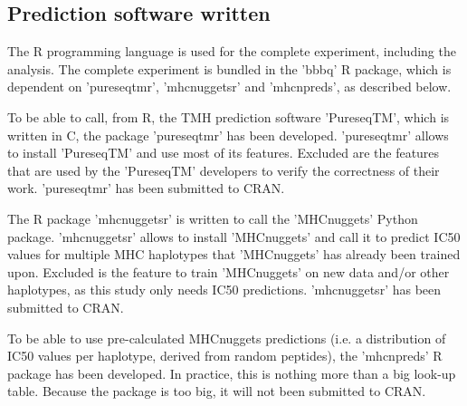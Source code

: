 % 

\subsection{Prediction software written}

The R programming language is used for the complete 
experiment, including the analysis.
The complete experiment is bundled in the 'bbbq' R package,
which is dependent on 'pureseqtmr', 'mhcnuggetsr' and 'mhcnpreds',
as described below.

To be able to call, from R, the TMH prediction software 'PureseqTM',
which is written in C, the package 'pureseqtmr' has been developed. 
'pureseqtmr' allows to install 'PureseqTM' and use most of its features.
Excluded are the features that are used by the 'PureseqTM' 
developers to verify the correctness of their work.
'pureseqtmr' has been submitted to CRAN.

The R package 'mhcnuggetsr' is written to call the 
'MHCnuggets' Python package.
'mhcnuggetsr' allows to install 'MHCnuggets' and call it
to predict IC50 values for multiple MHC haplotypes that 'MHCnuggets' 
has already been trained upon.
Excluded is the feature to train 'MHCnuggets' on new data and/or other
haplotypes, as this study only needs IC50 predictions.
'mhcnuggetsr' has been submitted to CRAN.

To be able to use pre-calculated MHCnuggets
predictions (i.e. a distribution of IC50 values per haplotype, 
derived from random peptides), the 'mhcnpreds' R package has been 
developed. In practice, this is nothing more than a big look-up table.
Because the package is too big, it will not been submitted to CRAN.

